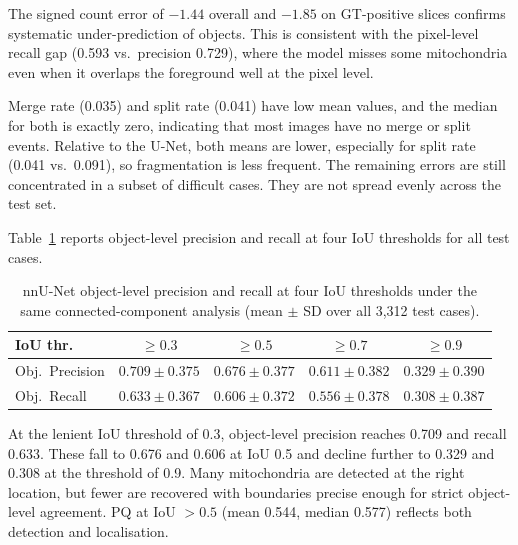 \documentclass[logo,bsc,singlespacing,parskip,online]{infthesis}
\begin{document}
The signed count error of $-1.44$ overall and $-1.85$ on GT-positive slices
confirms systematic under-prediction of objects. This is consistent with the
pixel-level recall gap (0.593 vs.\ precision 0.729), where the model misses some
mitochondria even when it overlaps the foreground well at the pixel level.

Merge rate (0.035) and split rate (0.041) have low mean values, and
the median for both is exactly zero, indicating that most images have no merge
or split events. Relative to the U-Net, both means are lower, especially for
split rate (0.041 vs.\ 0.091), so fragmentation is less frequent. The remaining
errors are still concentrated in a subset of difficult cases. They are not
spread evenly across the test set.

Table~\ref{tab:nnunet-obj-pr} reports object-level precision and recall at four
IoU thresholds for all test cases.

\begin{table}[H]
\centering
\normalsize
\renewcommand{\arraystretch}{1.08}
\caption{nnU-Net object-level precision and recall at four IoU thresholds
  under the same connected-component analysis (mean $\pm$ SD over all
  3,312 test cases).}
\label{tab:nnunet-obj-pr}
\begin{tabular}{lcccc}
\toprule
\textbf{IoU thr.} & $\geq 0.3$ & $\geq 0.5$ & $\geq 0.7$ & $\geq 0.9$ \\
\midrule
Obj.\ Precision & $0.709 \pm 0.375$ & $0.676 \pm 0.377$ & $0.611 \pm 0.382$ & $0.329 \pm 0.390$ \\
Obj.\ Recall    & $0.633 \pm 0.367$ & $0.606 \pm 0.372$ & $0.556 \pm 0.378$ & $0.308 \pm 0.387$ \\
\bottomrule
\end{tabular}
\end{table}

At the lenient IoU threshold of 0.3, object-level precision reaches 0.709 and
recall 0.633. These fall to 0.676 and 0.606 at IoU 0.5 and decline further to
0.329 and 0.308 at the threshold of 0.9. Many mitochondria are detected at
the right location, but fewer are recovered with boundaries precise enough for
strict object-level agreement. PQ at IoU $>0.5$ (mean 0.544, median 0.577)
reflects both detection and localisation.
\end{document}
